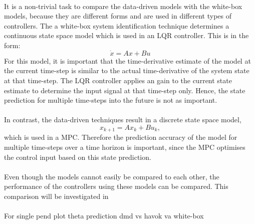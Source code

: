         
        \paragraph{}
        It is a non-trivial task to compare the data-driven models with the white-box models,
        because they are different forms and are used in different types of controllers.
        The a white-box system identification technique determines a continuous state space model 
        which is used in an LQR controller. 
        This is in the form:
        \begin{equation}
            \dot{x} = A x + B u
        \end{equation}
        For this model, it is important that the time-derivative estimate of the model 
        at the current time-step 
        is similar to the actual time-derivative of the system state at that time-step.
        The LQR controller applies an gain to the current state estimate 
        to determine the input signal at that time-step only.
        Hence, the state prediction for multiple time-steps into the future is not as important.

        \paragraph{}
        In contrast, the data-driven techniques result in a discrete state space model,
        \begin{equation}
            x_{k+1} = A x_k + B u_k ,
        \end{equation} 
        which is used in a MPC.
        Therefore the prediction accuracy of the model for multiple time-steps over a time horizon is important,
        since the MPC optimises the control input based on this state prediction.
        
        \paragraph{}
        Even though the models cannot easily be compared to each other, 
        the performance of the controllers using these models can be compared.
        This comparison will be investigated in %

        \paragraph{}
        For single pend
        plot theta prediction dmd vs havok va white-box

